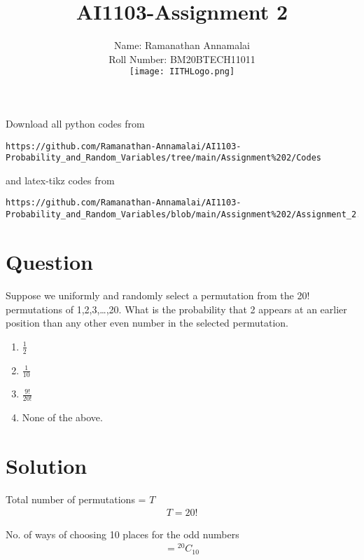 \documentclass[journal,12pt,twocolumn]{IEEEtran}
\begin{document}
\title{AI1103-Assignment 2}
\author{Name: Ramanathan Annamalai\\\normalsize{Roll Number: BM20BTECH11011\\\texttt{[image: IITHLogo.png]}}}
\maketitle
\newpage
\bigskip
\renewcommand{\thefigure}{\theenumi}
\renewcommand{\thetable}{\theenumi}
Download all python codes from 
\begin{lstlisting}
https://github.com/Ramanathan-Annamalai/AI1103-Probability_and_Random_Variables/tree/main/Assignment%202/Codes
\end{lstlisting}
%
and latex-tikz codes from 
%
\begin{lstlisting}
https://github.com/Ramanathan-Annamalai/AI1103-Probability_and_Random_Variables/blob/main/Assignment%202/Assignment_2.tex
\end{lstlisting}
\section*{\large{Question}}
Suppose we uniformly and randomly select a permutation from the 20\(!\) permutations of 1,2,3,\ldots,20. What is the probability that 2 appears at an earlier position than any other even number in the selected permutation.
\begin{enumerate}[label=(\Alph*)]
    \item \(\displaystyle\frac{1}{2}\)\newline
    \item \(\displaystyle\frac{1}{10}\)\newline
    \item \(\displaystyle\frac{9!}{20!}\)\newline
    \item \normalsize{None of the above.}\newline
\end{enumerate}

\section*{\large{Solution}}
Total number of permutations = \(T\)
\begin{align}
    T = 20!
\end{align}

No. of ways of choosing 10 places for the odd numbers 
\begin{align}
    = {}^{20}C_{10}
\end{align}
\end{document}
